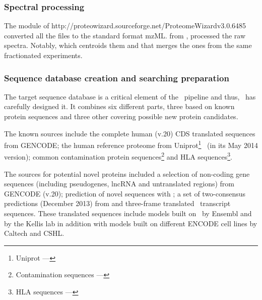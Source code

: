 \subsubsection{Spectral processing}\label{subsub:spectralProcessing}

The  module of %
{http://proteowizard.sourceforge.net/}{ProteomeWizard}{v3.0.6485}
converted all the files to the standard format mzML.\@
{} from
,
processed the raw spectra. Notably,  which centroids them
and  that merges the ones from the same fractionated experiments.\mybr\

\subsubsection{Sequence database creation and searching preparation}%
\label{subsub:seqDBseeking}

The target sequence database is a critical element of the \ms\ pipeline and thus,
\james\ has carefully designed it.
It combines six different parts, three based on
known protein sequences and three other covering possible new protein candidates.\mybr\

The known sources include the complete human  (v.20) \gls{CDS} translated
sequences from \gls{GENCODE}; the human reference proteome from
\gls{Uniprot}\footnote{%
\gls{Uniprot} --- }~
(in its May 2014 version); common contamination protein
sequences\footnote{Contamination sequences ---
}
and \gls{HLA} sequences\footnote{\gls{HLA} sequences ---
}.\mybr\

The sources for potential
novel proteins included a selection of non-coding gene sequences (including
pseudogenes, \gls{lncRNA} and untranslated regions) from \gls{GENCODE}
 (v.20); prediction of novel sequences with
;
a set of two-consensus predictions (December 2013)
from 
and three-frame translated \Rnaseq\ transcript sequences.
These translated sequences include models
built on \ibm\ by \gls{Ensembl} and by the Kellis lab in addition with
models built on different \gls{ENCODE} cell lines by Caltech and CSHL\@.\mybr\

